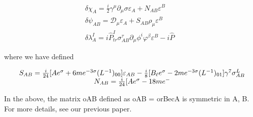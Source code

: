 \documentclass{article}
\begin{document}
\begin{equation}
\begin{array} { c } { \delta \chi _ { A } = \frac i 2 \gamma ^ { \mu } \partial _ { \mu } \sigma \varepsilon _ { A } + N _ { A B } \varepsilon ^ { B } \qquad } \\ { \delta \psi _ { A B } = \mathcal { D } _ { \mu } \varepsilon _ { A } + S _ { A B } \rho _ { \mu } \varepsilon ^ { B } \qquad } \\ { \delta \lambda _ { A } ^ { I } = i \hat { P } _ { t r } ^ { I } \sigma _ { A B } ^ { \tau } \partial _ { \mu } \phi ^ { i } \varphi ^ { \beta } \varepsilon ^ { B } - i \hat { P}}\end{array}
\end{equation}


where we have defined


\begin{equation}
\begin{array} { c c } { S _ { A B } = \frac { i } { 2 4 } [ A e ^ { \sigma } + 6 m e ^ { - 3 \sigma } ( L ^ { - 1 } ) _ { 0 0 } ] \varepsilon _ { A B } - \frac { i } { 8 } [ B _ { \ell } e ^ { \sigma } - 2 m e ^ { - 3 \sigma } ( L ^ { - 1 } ) _ { 0 1 } ] \gamma ^ { 7 } \sigma _ { A B } ^ { L } } \\ { N _ { A B } = \frac { i } { 2 4 } [ A e ^ { \sigma } - 1 8 m e ^ { -}}\end{array}
\end{equation}


In the above, the matrix oAB defined as oAB = orBecA is symmetric in A, B. For more
details, see our previous paper.
\end{document}
